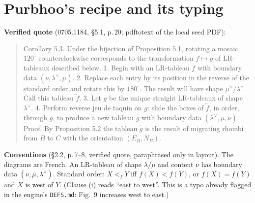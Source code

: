\documentclass[11pt]{article}
\theoremstyle{definition}
\begin{document}
\section{Purbhoo's recipe and its typing}
\textbf{Verified quote} (0705.1184, \S5.1, p.\,20; pdftotext of the local seed PDF):
\begin{quote}\small
Corollary 5.3. Under the bijection of Proposition 5.1, rotating a mosaic $120^\circ$ counterclockwise corresponds to
the transformation $f\mapsto\tilde g$ of LR-tableaux described below. 1. Begin with an LR-tableau $f$ with boundary data
$(\nu,\lambda^\vee,\mu)$. 2. Replace each entry by its position in the reverse of the standard order and rotate this by
$180^\circ$. The result will have shape $\mu^\vee/\lambda^\vee$. Call this tableau $\tilde f$. 3. Let $g$ be the unique
straight LR-tableaux of shape $\lambda^\vee$. 4. Perform reverse jeu de taquin on $g$: slide the boxes of $\tilde f$, in
order, through $g$, to produce a new tableau $\tilde g$ with boundary data $(\lambda^\vee,\mu,\nu)$.
Proof. By Proposition 5.2 the tableau $\tilde g$ is the result of migrating rhombi from $B$ to $C$ with the orientation $(E_B,N_B)$.
\end{quote}
\textbf{Conventions} (\S2.2, p.\,7--8, verified quote, paraphrased only in layout). The diagrams are French. An LR-tableau of shape
$\lambda/\mu$ and content $\nu$ has boundary data $(\nu,\mu,\lambda^\vee)$. Standard order: $X<_fY$ iff $f(X)<f(Y)$, or
$f(X)=f(Y)$ and $X$ is west of $Y$. (Clause (i) reads ``east to west''. This is a typo already flagged in the engine's
\texttt{DEFS.md}: Fig.~9 increases west to east.)
\end{document}
